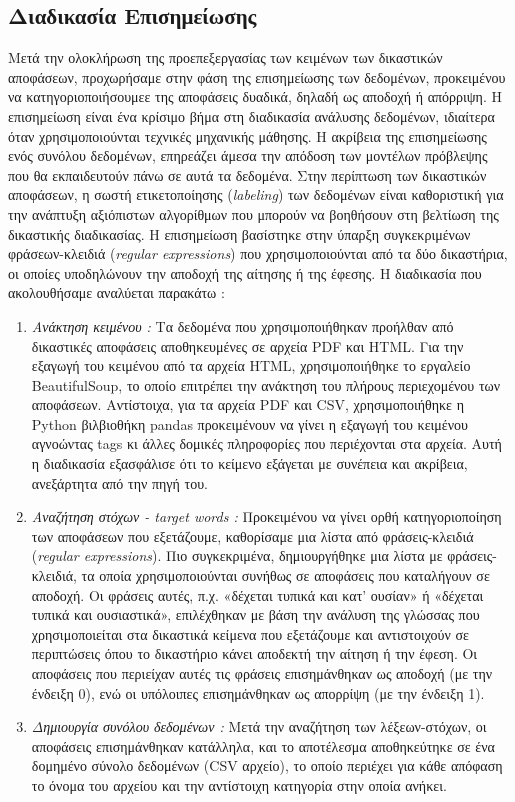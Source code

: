 \documentclass[diploma]{softlab-thesis}
\begin{document}
\begin{enumerate}
\section{Διαδικασία Επισημείωσης}

Μετά την ολοκλήρωση της προεπεξεργασίας των κειμένων των δικαστικών αποφάσεων, προχωρήσαμε στην φάση της επισημείωσης των δεδομένων, προκειμένου να κατηγοριοποιήσουμεε της αποφάσεις δυαδικά, δηλαδή ως αποδοχή ή απόρριψη. Η επισημείωση είναι ένα κρίσιμο βήμα στη διαδικασία ανάλυσης δεδομένων, ιδιαίτερα όταν χρησιμοποιούνται τεχνικές μηχανικής μάθησης. Η ακρίβεια της επισημείωσης ενός συνόλου δεδομένων, επηρεάζει άμεσα την απόδοση των μοντέλων πρόβλεψης που θα εκπαιδευτούν πάνω σε αυτά τα δεδομένα. Στην περίπτωση των δικαστικών αποφάσεων, η σωστή ετικετοποίησης (\textit{labeling}) των δεδομένων είναι καθοριστική για την ανάπτυξη αξιόπιστων αλγορίθμων που μπορούν να βοηθήσουν στη βελτίωση της δικαστικής διαδικασίας. 
Η επισημείωση βασίστηκε στην ύπαρξη συγκεκριμένων φράσεων-κλειδιά  (\textit{regular expressions}) που χρησιμοποιούνται από τα δύο δικαστήρια, οι οποίες υποδηλώνουν την αποδοχή της αίτησης ή της έφεσης. Η διαδικασία που ακολουθήσαμε αναλύεται παρακάτω :

\begin{enumerate}
\item \textit{Ανάκτηση κειμένου :} Τα δεδομένα που χρησιμοποιήθηκαν προήλθαν από δικαστικές αποφάσεις αποθηκευμένες σε αρχεία PDF και HTML. Για την εξαγωγή του κειμένου από τα αρχεία HTML, χρησιμοποιήθηκε το εργαλείο BeautifulSoup, το οποίο επιτρέπει την ανάκτηση του πλήρους περιεχομένου των αποφάσεων. Αντίστοιχα, για τα αρχεία PDF και CSV, χρησιμοποιήθηκε η Python βιλβιοθήκη pandas προκειμένουν να γίνει η εξαγωγή του κειμένου αγνοώντας tags κι άλλες δομικές πληροφορίες που περιέχονται στα αρχεία. Αυτή η διαδικασία εξασφάλισε ότι το κείμενο εξάγεται με συνέπεια και ακρίβεια, ανεξάρτητα από την πηγή του.
\item \textit{Αναζήτηση στόχων - target words :} Προκειμένου να γίνει ορθή κατηγοριοποίηση των αποφάσεων που εξετάζουμε, καθορίσαμε μια λίστα από φράσεις-κλειδιά (\textit{regular expressions}). Πιο συγκεκριμένα, δημιουργήθηκε μια λίστα με φράσεις-κλειδιά, τα οποία χρησιμοποιούνται συνήθως σε αποφάσεις που καταλήγουν σε αποδοχή. Οι φράσεις αυτές, π.χ. «δέχεται τυπικά και κατ’ ουσίαν» ή «δέχεται τυπικά και ουσιαστικά», επιλέχθηκαν με βάση την ανάλυση της γλώσσας που χρησιμοποιείται στα δικαστικά κείμενα που εξετάζουμε και αντιστοιχούν σε περιπτώσεις όπου το δικαστήριο κάνει αποδεκτή την αίτηση ή την έφεση. Οι αποφάσεις που περιείχαν αυτές τις φράσεις επισημάνθηκαν ως αποδοχή (με την ένδειξη 0), ενώ οι υπόλοιπες επισημάνθηκαν ως απορρίψη (με την ένδειξη 1).
\item \textit{Δημιουργία συνόλου δεδομένων :} Μετά την αναζήτηση των λέξεων-στόχων, οι αποφάσεις επισημάνθηκαν κατάλληλα, και το αποτέλεσμα αποθηκεύτηκε σε ένα δομημένο σύνολο δεδομένων (CSV αρχείο), το οποίο περιέχει για κάθε απόφαση το όνομα του αρχείου και την αντίστοιχη κατηγορία στην οποία ανήκει.



\end{enumerate}
\end{enumerate}
\end{document}
